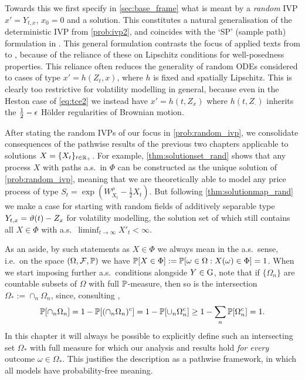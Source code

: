 Towards this we first specify in \autoref{sec:base_frame} what is meant by a \emph{random} IVP $x'=Y_{t,x}$, $x_0=0$ and a solution. This constitutes a natural generalisation of the deterministic IVP from \autoref{prob:ivp2}, and coincides with the `SP' (sample path) formulation in \cite{strand_1970}. This general formulation contrasts the focus of applied texts from \cite{soong_1973} to \cite{han_2017}, because of the reliance of these on Lipschitz conditions for well-posedness properties. This reliance often reduces the generality of random ODEs considered to cases of type $x'=h(Z_t,x)$, where $h$ is fixed and spatially Lipschitz. This is clearly too restrictive for volatility modelling in general, because even in the Heston case of \autoref{eq:tce2} we instead have $x'=h(t,Z_x)$ where $h(t,Z_\cdot)$ inherits the $\frac12-\epsilon$ H\"older regularities of Brownian motion.

After stating the random IVPs of our focus in \autoref{prob:random_ivp}, we consolidate consequences of the pathwise results of the previous two chapters applicable to solutions $X=\{X_t\}_{t\in\mathbb{R}_+}$. For example, \autoref{thm:solutionset_rand} shows that any process $X$ with paths a.s.~in $\Phi$ can be constructed as the unique solution of \autoref{prob:random_ivp}, meaning that we are theoretically able to model any price process of type $S_t = \exp\left(W^\rho_{X_t} - \tfrac12 X_t\right)$. But following \autoref{thm:solutionmap_rand} we make a case for starting with random fields of additively separable type $Y_{t,x} = \vartheta(t) - Z_x$ for volatility modelling, the solution set of which still contains all $X\in\Phi$ with a.s.~$\liminf_{t\to\infty}X'_t<\infty$.

As an aside, by such statements as $X\in\Phi$ we always mean in the a.s.~sense, i.e.~on the space $(\Omega,\mathcal{F},\mathbb{P})$ we have $\mathbb{P}[X\in\Phi]:=\mathbb{P}[\omega\in\Omega:X(\omega)\in\Phi]=1$. When we start imposing further a.s.~conditions alongside $Y\in\mathrm{G}$, note that if $\{\Omega_n\}$ are countable subsets of $\Omega$ with full $\mathbb{P}$-measure, then so is the intersection $\Omega_*:=\cap_{n}\Omega_n$, since, consulting \cite{billingsley_1995},
\begin{equation}\label{eq:full_measure}
    \mathbb{P}[\cap_n\Omega_n]=1-\mathbb{P}[(\cap_n\Omega_n)^c]=1-\mathbb{P}[\cup_n\Omega^c_n]\ge1-\sum_n\mathbb{P}[\Omega_n^c]=1.
\end{equation}
In this chapter it will always be possible to explicitly define such an intersecting set $\Omega_*$ with full measure for which our analysis and results hold \emph{for every} outcome $\omega\in\Omega_*$. This justifies the description as a pathwise framework, in which all models have probability-free meaning.

